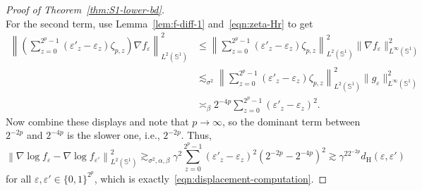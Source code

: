 \documentclass[preprint]{imsart}
\theoremstyle{plain}
\theoremstyle{definition}
\begin{document}
\begin{appendix}
\begin{proof}[Proof of Theorem~\ref{thm:S1-lower-bd}]
\begin{equation*}
    \end{equation*}
    For the second term, use Lemma~\ref{lem:f-diff-1} and~\eqref{eqn:zeta-Hr} to get 
    \begin{align*}
        \left\|\left(\sum_{z=0}^{2^p-1}(\varepsilon'_z-\varepsilon_z)\zeta_{p,z}\right)\nabla f_{\varepsilon}\right\|^2_{L^2(\mathbb{S}^1)} &\le \left\|\sum_{z=0}^{2^p-1}(\varepsilon'_z-\varepsilon_z)\zeta_{p,z}\right\|^2_{L^2(\mathbb{S}^1)}\|\nabla f_{\varepsilon}\|^2_{L^{\infty}(\mathbb{S}^1)} \\ &\lesssim_{\sigma^2} \left\|\sum_{z=0}^{2^p-1}(\varepsilon'_z-\varepsilon_z)\zeta_{p,z}\right\|^2_{L^2(\mathbb{S}^1)}\|g_{\varepsilon}\|_{L^{\infty}(\mathbb{S}^1)}^2 \\
        &\asymp_{\beta} 2^{-4p}\sum_{z=0}^{2^p-1}(\varepsilon'_z-\varepsilon_z)^2.
    \end{align*}
    Now combine these displays and note that $p\to\infty$, so the dominant term between $2^{-2p}$ and $2^{-4p}$ is the slower one, i.e., $2^{-2p}$.
    Thus,
    \begin{equation*}
        \left\|\nabla \log f_{\varepsilon}-\nabla \log f_{\varepsilon'}\right\|_{L^2(\mathbb{S}^1)}^2 \gtrsim_{\sigma^2,\alpha,\beta}\gamma^2\sum_{z=0}^{2^p-1}(\varepsilon'_z-\varepsilon_z)^2\left(2^{-2p}-2^{-4p}\right)^2 \gtrsim \gamma^22^{-2p}d_{\mathrm{H}}(\varepsilon,\varepsilon')
    \end{equation*}
    for all $\varepsilon,\varepsilon'\in\{0,1\}^{2^p}$, which is exactly~\eqref{eqn:displacement-computation}.


\end{proof}
\end{appendix}
\end{document}
